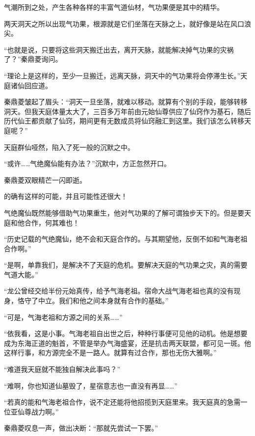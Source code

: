 \begin{this_body}
气潮所到之处，产生各种各样的丰富气道仙材，气功果便是其中的精华。

两天洞天之所以出现气功果，根源就是它们坐落在天脉之上，就好像是站在风口浪尖。

“也就是说，只要将这些洞天搬迁出去，离开天脉，就能解决掉气功果的灾祸了？”秦鼎菱询问。

“理论上是这样的，至少一旦搬迁，远离天脉，洞天中的气功果将会停滞生长。”天庭诸仙回应道。

秦鼎菱皱起了眉头：“洞天一旦坐落，就难以移动。就算有个别的手段，能够转移洞天。但我天庭体量太大了，三百多万年前由元始仙尊供应了仙窍作为基石，随后历代仙王都贡献了仙窍，期间更有无数成员将仙窍融汇到这里。我们该怎么转移天庭呢？”

天庭群仙哑然，陷入了死一般的沉默之中。

“或许……气绝魔仙能有办法？”沉默中，方正忽然开口。

秦鼎菱双眼精芒一闪即逝。

的确有这样的可能，并且可能性还很大！

气绝魔仙既然能够借助气功果重生，他对气功果的了解可谓独步天下的。但是要天庭和他合作，何其难也！

“历史记载的气绝魔仙，绝不会和天庭合作的。与其期望他，反倒不如和气海老祖合作啊。”

“是啊，单靠我们，是解决不了天庭的危机。要解决天庭的气功果之灾，真的需要气道大能。”

“龙公曾经交给半份元始真传，给予气海老祖。宿命大战气海老祖也真的没有现身，恪守了中立。我们和他之间本身就有合作的基础。”

“可是，气海老祖和方源之间的关系……”

“依我看，这是小事。气海老祖自出世之后，种种行事便可见他的动机。他是想要成为东海正道的魁首，不管是举办气海盛宴，还是抗击两天联盟，都可见一斑。他这样行事，和方源完全不是一路人。就算有过合作，那也无伤大雅啊。”

“难道我天庭就不能独自解决此事吗？”

“难啊，你也知道仙墓毁了，星宿意志也一直没有再显……”

“若真的能和气海老祖合作，说不定还能将他招揽到天庭里来。我天庭真的急需一位亚仙尊战力啊。”

秦鼎菱叹息一声，做出决断：“那就先尝试一下罢。”

\end{this_body}

